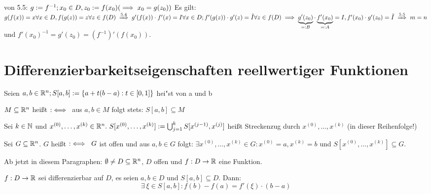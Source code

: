 \documentclass[a4paper,twoside,DIV15,BCOR12mm,chapterprefix=true,headings=twolinechapter]{scrbook}
\begin{document}
\begin{beweis} von 5.5: $g:=f^{-1}; x_0 \in D, z_0:=f(x_0) (\implies x_0 = g(z_0))$
Es gilt: $g(f(x)) = x \forall x \in D, f(g(z)) = z \forall z \in f(D) \folgtnach{5.4} g'(f(x))\cdot f'(x) = I \forall x \in D; f'(g(z))\cdot g'(z) = \tilde{I}
\forall z \in f(D) \folgt \underbrace{g'(z_0)}_{=:B}\cdot \underbrace{f'(x_0)}_{=:A} = I, f'(x_0)\cdot g'(z_0) = \tilde{I} \folgtnach{5.5} m = n$ und $f'(x_0)^{-1} = g'(z_0) = (f^{-1})'(f(x_0))$.
\end{beweis}

\theoremstyle{numberbreak}
\newtheorem{spezialfall}[satz]{Spezialfall}
\chapter{Differenzierbarkeitseigenschaften reellwertiger Funktionen}
\def\grad{\mathop{\rm grad}\nolimits}

\begin{definition}
\begin{liste}
\item Seien $a,b \in \mathbb{R}^n; S[a,b]:=\{a+t(b-a): t\in [0,1]\}$ hei"st
 von a und b
\item $M\subseteq \mathbb{R}^n$ heißt  $:\iff$\ aus $a,b \in M$ folgt
stets: $S[a,b] \subseteq M$
\item Sei $k \in \mathbb{N}$ und $x^{(0)},\ldots,x^{(k)} \in \MdR^n.\ S[x^{(0)},\ldots,x^{(k)}]:=\bigcup_{j=1}^{k}S[x^{(j-1)}, x^{(j)}]$ heißt Streckenzug durch $x^{(0)},\ldots,x^{(k)}$ (in dieser Reihenfolge!)
\item Sei $G \subseteq \mathbb{R}^n$. $G$ heißt $:\iff\ G$ ist offen und aus $a,b \in G$ folgt: $\exists x^{(0)},\ldots,x^{(k)} \in G: x^{(0)}=a, x^{(k)}=b$ und $S[x^{(0)},\ldots,x^{(k)}] \subseteq G$.
\end{liste}
\end{definition}

\begin{vereinbarung}
Ab jetzt in diesem Paragraphen: $\emptyset \ne D \subseteq \mathbb{R}^n$, $D$ offen und
$f:D\to \mathbb{R}$ eine Funktion.
\end{vereinbarung}

\begin{satz}
$f:D\to\mathbb{R}$ sei differenzierbar auf $D$, es seien $a,b \in D$ und $S[a,b]\subseteq D$. Dann: $$\exists\ \xi \in S[a,b]: f(b)-f(a)=f'(\xi)\cdot(b-a)$$
$ $%
\end{satz}
\end{document}

